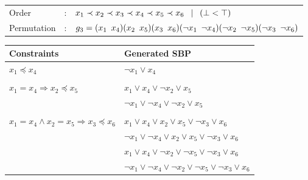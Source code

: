 

%
%
%


\begin{center}
	\begin{tabular}{lll}
		Order &:& $ x_1 \prec x_2 \prec x_3 \prec x_4 \prec x_5 \prec x_6 \enskip \mid \enskip  (\bot < \top)$ \\
		Permutation &:& $g_3 = (x_1 \enskip x_4)(x_2 \enskip x_5)(x_3 \enskip x_6)(\neg x_1 \enskip \neg x_4)(\neg x_2 \enskip \neg x_5)(\neg x_3 \enskip \neg x_6)$
	\end{tabular}
	
	\vspace*{2\baselineskip}
	
	\begin{tabular}{ll}
		Constraints & Generated SBP\\
		\midrule
		$x_1 \preceq x_4$ & $ \neg x_1 \lor x_4$ \\
		&\\
		$x_1 = x_4 \Rightarrow x_2 \preceq x_5$ & $ x_1 \lor x_4 \lor \neg x_2 \lor x_5$\\
		&$ \neg x_1 \lor \neg x_4 \lor \neg x_2 \lor x_5$\\
		&\\
		$x_1 = x_4 \land x_2 = x_5 \Rightarrow x_3 \preceq x_6$ &
		  $ x_1 \lor x_4 \lor x_2 \lor x_5 \lor \neg x_3 \lor x_6$ \\
		& $ \neg x_1 \lor \neg x_4 \lor x_2 \lor x_5 \lor \neg x_3 \lor x_6$ \\
		& $ x_1 \lor x_4 \lor \neg x_2 \lor \neg x_5 \lor \neg x_3 \lor x_6$ \\
		& $ \neg x_1 \lor \neg x_4 \lor \neg x_2 \lor \neg x_5 \lor \neg x_3 \lor x_6$ \\ 

	\end{tabular}
\end{center}





